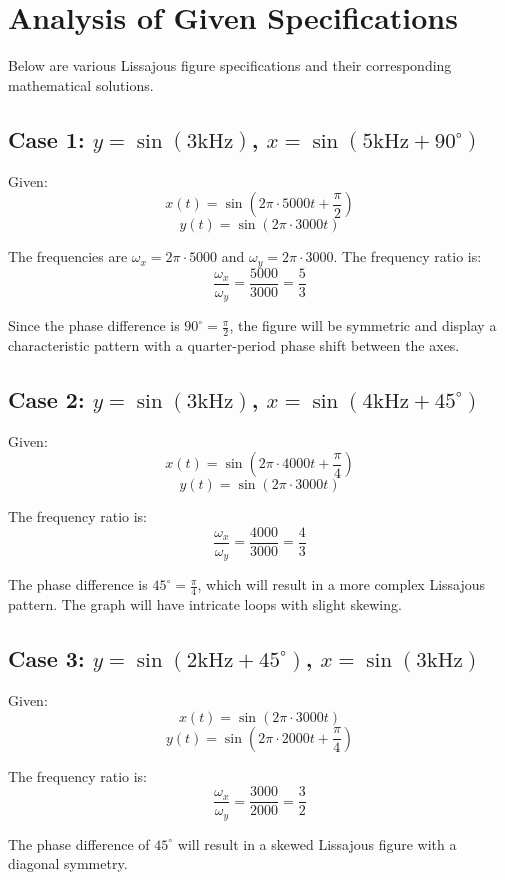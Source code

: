 \documentclass{article}
\begin{document}
\section{Analysis of Given Specifications}
Below are various Lissajous figure specifications and their corresponding mathematical solutions.

\subsection{Case 1: $y = \sin(3\text{kHz})$, $x = \sin(5\text{kHz} + 90^\circ)$}

Given:
\[
x(t) = \sin(2\pi \cdot 5000 t + \frac{\pi}{2})
\]
\[
y(t) = \sin(2\pi \cdot 3000 t)
\]

The frequencies are \( \omega_x = 2\pi \cdot 5000 \) and \( \omega_y = 2\pi \cdot 3000 \). The frequency ratio is:
\[
\frac{\omega_x}{\omega_y} = \frac{5000}{3000} = \frac{5}{3}
\]

Since the phase difference is \( 90^\circ = \frac{\pi}{2} \), the figure will be symmetric and display a characteristic pattern with a quarter-period phase shift between the axes.

\subsection{Case 2: $y = \sin(3\text{kHz})$, $x = \sin(4\text{kHz} + 45^\circ)$}

Given:
\[
x(t) = \sin(2\pi \cdot 4000 t + \frac{\pi}{4})
\]
\[
y(t) = \sin(2\pi \cdot 3000 t)
\]

The frequency ratio is:
\[
\frac{\omega_x}{\omega_y} = \frac{4000}{3000} = \frac{4}{3}
\]

The phase difference is \( 45^\circ = \frac{\pi}{4} \), which will result in a more complex Lissajous pattern. The graph will have intricate loops with slight skewing.

\subsection{Case 3: $y = \sin(2\text{kHz} + 45^\circ)$, $x = \sin(3\text{kHz})$}

Given:
\[
x(t) = \sin(2\pi \cdot 3000 t)
\]
\[
y(t) = \sin(2\pi \cdot 2000 t + \frac{\pi}{4})
\]

The frequency ratio is:
\[
\frac{\omega_x}{\omega_y} = \frac{3000}{2000} = \frac{3}{2}
\]

The phase difference of \( 45^\circ \) will result in a skewed Lissajous figure with a diagonal symmetry.
\end{document}
